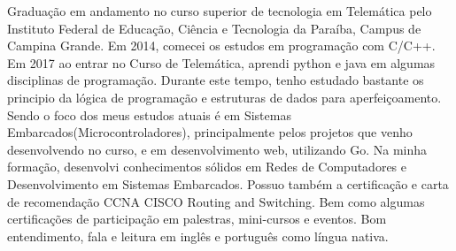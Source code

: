 \begin{cvletter}
  Graduação em andamento no curso superior de tecnologia em Telemática pelo Instituto Federal de Educação, Ciência e Tecnologia da Paraíba, Campus de Campina Grande. Em 2014, comecei os estudos em programação com C/C++. Em 2017 ao entrar no Curso de Telemática, aprendi python e java em algumas disciplinas de programação. Durante este tempo, tenho estudado bastante os principio da lógica de programação e estruturas de dados para aperfeiçoamento. Sendo o foco dos meus estudos atuais é em Sistemas Embarcados(Microcontroladores), principalmente pelos projetos que venho desenvolvendo no curso, e em desenvolvimento web, utilizando Go. Na minha formação, desenvolvi conhecimentos sólidos em Redes de Computadores e Desenvolvimento em Sistemas Embarcados. Possuo também a certificação e carta de recomendação CCNA CISCO Routing and Switching. Bem como algumas certificações de participação em palestras, mini-cursos e eventos. Bom entendimento, fala e leitura em inglês e português como língua nativa.

\end{cvletter}